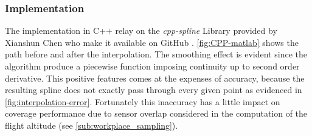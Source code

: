 \subsubsection{Implementation} %
\label{ssub:implementation}
The implementation in C++ relay on the \textit{cpp-spline} Library provided by Xianshun Chen who make it available on GitHub \cite{cpp-spline}. \autoref{fig:CPP-matlab} shows the path before and after the interpolation. The smoothing effect is evident since the algorithm produce a piecewise function imposing continuity up to second order derivative. This positive features comes at the expenses of accuracy, because the resulting spline does not exactly pass through every given point as evidenced in \autoref{fig:interpolation-error}. Fortunately this inaccuracy has a little impact on coverage performance due to sensor overlap considered in the computation of the flight altitude (see \autoref{sub:workplace_sampling}).
